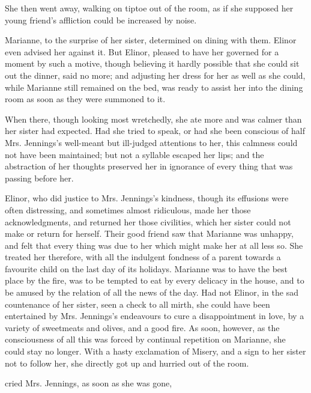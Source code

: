 She then went away, walking on tiptoe out of the room, as if she supposed her young friend's affliction could be increased by noise.

Marianne, to the surprise of her sister, determined on dining with them. Elinor even advised her against it. But  Elinor, pleased to have her governed for a moment by such a motive, though believing it hardly possible that she could sit out the dinner, said no more; and adjusting her dress for her as well as she could, while Marianne still remained on the bed, was ready to assist her into the dining room as soon as they were summoned to it.

When there, though looking most wretchedly, she ate more and was calmer than her sister had expected. Had she tried to speak, or had she been conscious of half Mrs. Jennings's well-meant but ill-judged attentions to her, this calmness could not have been maintained; but not a syllable escaped her lips; and the abstraction of her thoughts preserved her in ignorance of every thing that was passing before her.

Elinor, who did justice to Mrs. Jennings's kindness, though its effusions were often distressing, and sometimes almost ridiculous, made her those acknowledgments, and returned her those civilities, which her sister could not make or return for herself. Their good friend saw that Marianne was unhappy, and felt that every thing was due to her which might make her at all less so. She treated her therefore, with all the indulgent fondness of a parent towards a favourite child on the last day of its holidays. Marianne was to have the best place by the fire, was to be tempted to eat by every delicacy in the house, and to be amused by the relation of all the news of the day. Had not Elinor, in the sad countenance of her sister, seen a check to all mirth, she could have been entertained by Mrs. Jennings's endeavours to cure a disappointment in love, by a variety of sweetmeats and olives, and a good fire. As soon, however, as the consciousness of all this was forced by continual repetition on Marianne, she could stay no longer. With a hasty exclamation of Misery, and a sign to her sister not to follow her, she directly got up and hurried out of the room.

 cried Mrs. Jennings, as soon as she was gone, 

